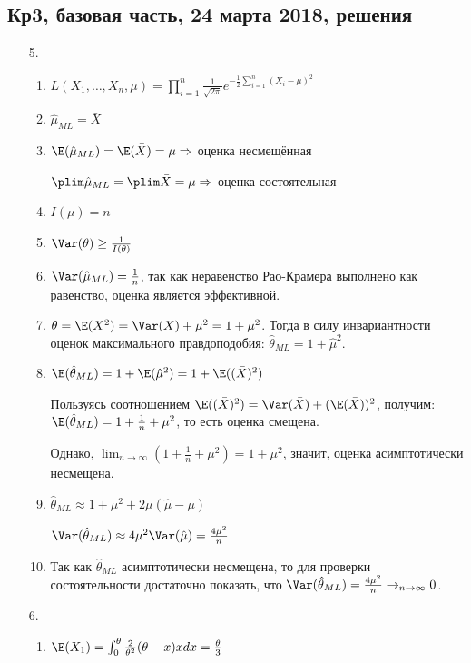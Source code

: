 \subsection{Кр3, базовая часть, 24 марта 2018, решения}

\begin{enumerate}
\item[5.]
\begin{enumerate}
\item $L(X_1, \ldots, X_n, \mu) = \prod_{i=1}^n \frac{1}{\sqrt{2\pi}} e^{-\frac{1}{2}\sum_{i=1}^n (X_i - \mu)^2}$
\item $\hat\mu_{ML} = \bar X$
\item $\E(\hat\mu_{ML}) = \E(\bar X) = \mu \Rightarrow$ оценка несмещённая

$\plim \hat \mu_{ML} = \plim \bar X = \mu \Rightarrow$ оценка состоятельная
\item $I(\mu) = n$
\item $\Var(\theta) \geq \frac{1}{I(\theta)}$
\item $\Var(\hat \mu_{ML}) = \frac{1}{n}$, так как неравенство Рао-Крамера выполнено
как равенство, оценка является эффективной.
\item $\theta = \E(X^2) = \Var(X) + \mu^2 = 1 + \mu^2$.
Тогда в силу инвариантности оценок максимального правдоподобия: $\hat\theta_{ML} = 1 + \hat\mu^2$.
\item $\E(\hat \theta_{ML}) = 1 + \E(\hat \mu^2) = 1 + \E((\bar X)^2)$

Пользуясь соотношением $\E((\bar X)^2) = \Var(\bar X) + (\E(\bar X))^2$,
получим: $\E(\hat \theta_{ML}) = 1 + \frac{1}{n} + \mu^2$, то есть оценка смещена.

Однако, $\lim_{n \to \infty} \left(1 + \frac{1}{n} + \mu^2\right) = 1 + \mu^2$, значит,
оценка асимптотически несмещена.
\item $\hat \theta_{ML} \approx 1 + \mu^2 + 2\mu(\hat \mu - \mu)$

$\Var(\hat \theta_{ML}) \approx 4 \mu^2 \Var(\hat \mu) = \frac{4 \mu^2}{n}$
\item Так как $\hat \theta_{ML}$ асимптотически несмещена, то для проверки
состоятельности достаточно показать, что
$\Var(\hat \theta_{ML}) = \frac{4\mu^2}{n} \to_{n \to \infty} 0$.
\end{enumerate}
\item[6.]
\begin{enumerate}
\item $\E(X_1) = \int_{0}^{\theta} \frac{2}{\theta^2}(\theta - x)x dx = \frac{\theta}{3}$


\end{enumerate}
\end{enumerate}
